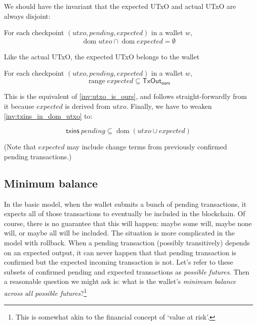 \documentclass{article}
\DeclareMathOperator{\dom}{dom}
\DeclareMathOperator{\range}{range}
\theoremstyle{definition}{
  \newtheorem{lemma}{Lemma}[section] %
  \newtheorem{definition}[lemma]{Definition}
}
\theoremstyle{theorem}{
  \newtheorem{invariant}[lemma]{Invariant}
  \newtheorem{proofobligation}[lemma]{Proof Obligation}
}
\numberwithin{equation}{lemma}
\begin{document}
We should have the invariant that the expected UTxO and actual UTxO are always
disjoint:

\begin{invariant}
For each checkpoint $(\mathit{utxo}, \mathit{pending}, \mathit{expected})$ in a wallet $w$,
\begin{equation*}
\dom \mathit{utxo} \cap \dom \mathit{expected} = \emptyset
\end{equation*}
\end{invariant}

Like the actual UTxO, the expected UTxO belongs to the wallet

\begin{invariant}
For each checkpoint $(\mathit{utxo}, \mathit{pending}, \mathit{expected})$ in a wallet $w$,
\begin{equation*}
\range \mathit{expected} \subseteq \mathsf{TxOut}_\mathsf{ours}
\end{equation*}
\end{invariant}

This is the equivalent of \cref{inv:utxo_is_ours}, and follows
straight-forwardly from it because $\mathit{expected}$ is derived from
$\mathit{utxo}$. Finally, we have to weaken
\cref{inv:txins_in_dom_utxo} to:

\begin{invariant}
\begin{equation*}
\mathsf{txins} ~ \mathit{pending} \subseteq \dom (\mathit{utxo} \cup \mathit{expected})
\end{equation*}
\label{inv:txins_in_dom_utxo_expected_pending}
\end{invariant}

(Note that $\mathit{expected}$ may include change terms from previously
confirmed pending transactions.)

\subsection{Minimum balance}

In the basic model, when the wallet submits a bunch of pending transactions, it
expects all of those transactions to eventually be included in the blockchain.
Of course, there is no guarantee that this will happen: maybe some will, maybe
none will, or maybe all will be included. The situation is more complicated in
the model with rollback. When a pending transaction (possibly transitively)
depends on an expected output, it can never happen that that pending transaction
is confirmed but the expected incoming transaction is not. Let's refer to these
subsets of confirmed pending and expected transactions as \emph{possible futures}.
Then a reasonable question we might ask is: what is the wallet's \emph{minimum
balance across all possible futures}?\footnote{This is somewhat akin to the
financial concept of `value at risk'.}
\end{document}
